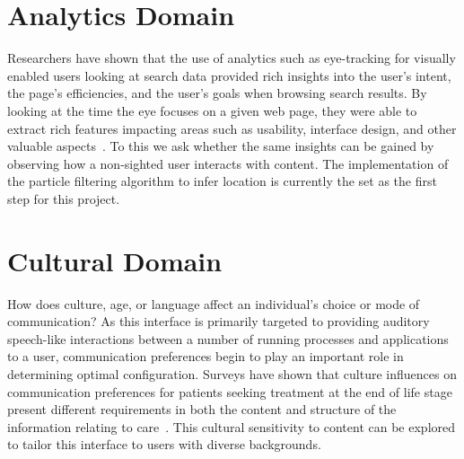 \section{                  Analytics Domain                                   }

Researchers have shown that the use of analytics such as eye-tracking for
visually enabled users looking at search data provided rich insights into the
user's intent, the page's efficiencies, and the user's goals when browsing
search results.  By looking at the time the eye focuses on a given web page,
they were able to extract rich features impacting areas such as usability,
interface design, and other valuable aspects~\cite{granka2004eye}.  To this we
ask whether the same insights can be gained by observing how a non-sighted user
interacts with content.  The implementation of the particle filtering algorithm
to infer location is currently the set as the first step for this project.



\section{                  Cultural Domain                                    }

How does culture, age, or language affect an individual's choice or mode of
communication?  As this interface is primarily targeted to providing auditory
speech-like interactions between a number of running processes and applications
to a user, communication preferences begin to play an important role in
determining optimal configuration.  Surveys have shown that culture influences
on communication preferences for patients seeking treatment at the end of life
stage present different requirements in both the content and structure of the
information relating to care~\cite{shrank2005focus}. This cultural sensitivity
to content can be explored to tailor this interface to users with diverse
backgrounds.
